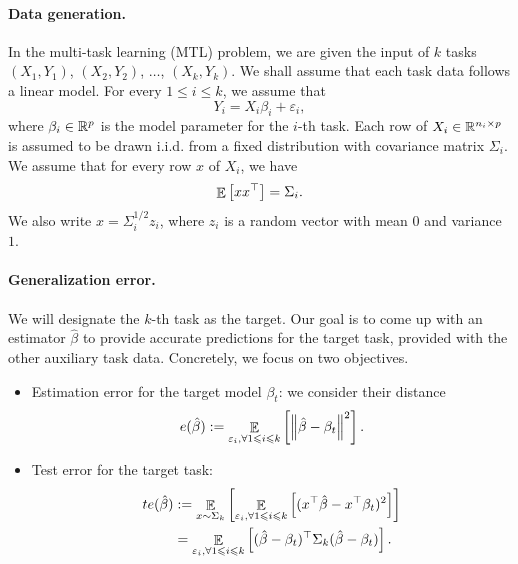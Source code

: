 \paragraph{Data generation.}
In the multi-task learning (MTL) problem, we are given the input of $k$ tasks $(X_1, Y_1)$, $(X_2, Y_2)$, $\dots$, $(X_k, Y_k)$.
We shall assume that each task data follows a linear model.
For every $1\le i\le k$, we assume that
\[ Y_i = X_i \beta_i + \varepsilon_i, \]
where $\beta_i\in\mathbb{R}^p$ is the model parameter for the $i$-th task.
Each row of $X_i\in\mathbb{R}^{n_i\times p}$ is assumed to be drawn i.i.d. from a fixed distribution with covariance matrix $\Sigma_i$.
We assume that for every row $x$ of $X_i$, we have
\[ \mathop{\mathbb{E}}\left[ xx^{\top} \right] = \Sigma_i. \]
We also write $x = \Sigma_i^{1/2} z_i$, where $z_i$ is a random vector with mean $0$ and variance $1$.


\paragraph{Generalization error.}
We will designate the $k$-th task as the target.
Our goal is to come up with an estimator $\hat{\beta}$ to provide accurate predictions for the target task, provided with the other auxiliary task data.
Concretely, we focus on two objectives.
\begin{itemize}
	\item Estimation error for the target model $\beta_t$: we consider their distance
		\[ e(\hat{\beta}) := \mathop{\mathbb{E}}_{\varepsilon_i, \forall 1\leqslant i\leqslant k}\left[ \left\| \hat{\beta} - \beta_t \right\|^2 \right]. \]
	\item Test error for the target task:
		\begin{align*}
			te(\hat{\beta}) &:= \mathop{\mathbb{E}}_{x \sim \Sigma_k}\left[ \mathop{\mathbb{E}}_{{\varepsilon_i, \forall 1\leqslant i\leqslant k}}\left[ (x^{\top}\hat{\beta} - x^{\top}\beta_t)^2 \right] \right] \\
			&= \mathop{\mathbb{E}}_{\varepsilon_i, \forall 1\leqslant i\leqslant k}\left[ (\hat{\beta} - \beta_t)^{\top}\Sigma_k(\hat{\beta} - \beta_t) \right].
		\end{align*}
\end{itemize}

